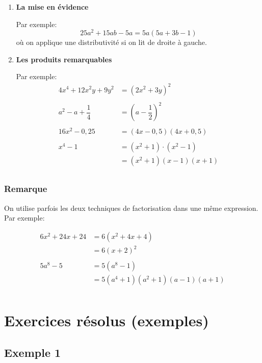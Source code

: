 \documentclass[
  12pt,
]{book}
\begin{document}
\begin{enumerate}
\def\labelenumi{\alph{enumi}.}
\item
  \textbf{La mise en évidence}

  Par exemple: \[25a^2+15ab-5a = 5a(5a+3b-1)\] où on applique une distributivité si on lit de droite à gauche.
\item
  \textbf{Les produits remarquables}

  Par exemple:
  \begin{align*}
   4x^4 + 12x^2y+9y^2 &= (2x^2+3y)^2\\
   \\
   a^2-a+\dfrac{1}{4} &= (a-\dfrac{1}{2})^2\\
   \\
   16x^2-0{,}25 &= (4x-0{,}5)(4x+0{,}5)\\
   \\
   x^4-1 &= (x^2+1)\cdot(x^2-1)\\
         & =(x^2+1)(x-1)(x+1)\\
  \end{align*}
\end{enumerate}

\hypertarget{remarque-1}{%
\subsubsection*{Remarque}\label{remarque-1}}

On utilise parfois les deux techniques de factorisation dans une même expression.
Par exemple:

\begin{align*}
6x^2+24x+24 &= 6(x^2+4x+4)\\
            &= 6(x+2)^2\\
\\
5a^8-5 &= 5(a^8-1)\\
       &= 5(a^4+1)(a^2+1)(a-1)(a+1)\\
\end{align*}

\hypertarget{exercices-ruxe9solus-exemples-1}{%
\section{Exercices résolus (exemples)}\label{exercices-ruxe9solus-exemples-1}}

\hypertarget{exemple-1-2}{%
\subsection{Exemple 1}\label{exemple-1-2}}
\end{document}
